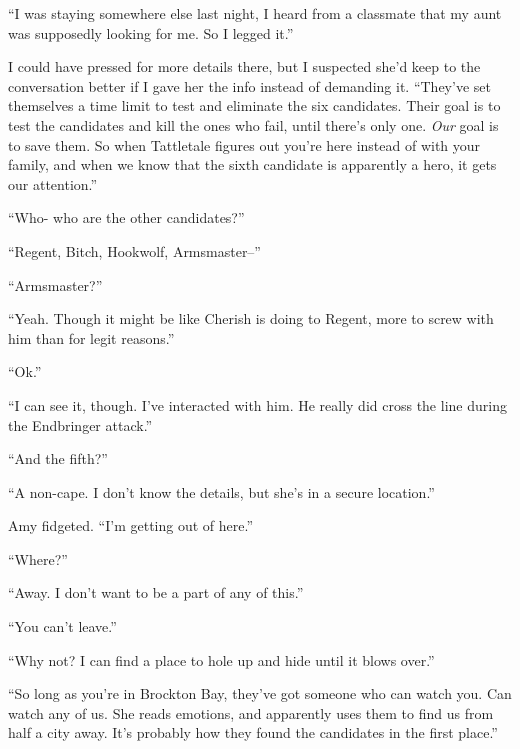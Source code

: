 ``I was staying somewhere else last night, I heard from a classmate that my aunt was supposedly looking for me.  So I legged it.''



I could have pressed for more details there, but I suspected she'd keep to the conversation better if I gave her the info instead of demanding it.  ``They've set themselves a time limit to test and eliminate the six candidates.  Their goal is to test the candidates and kill the ones who fail, until there's only one.  \emph{Our} goal is to save them.  So when Tattletale figures out you're here instead of with your family, and when we know that the sixth candidate is apparently a hero, it gets our attention.''



``Who- who are the other candidates?''



``Regent, Bitch, Hookwolf, Armsmaster--''



``Armsmaster?''



``Yeah.  Though it might be like Cherish is doing to Regent, more to screw with him than for legit reasons.''



``Ok.''



``I can see it, though.  I've interacted with him.  He really did cross the line during the Endbringer attack.''



``And the fifth?''



``A non-cape.  I don't know the details, but she's in a secure location.''



Amy fidgeted.  ``I'm getting out of here.''



``Where?''



``Away.  I don't want to be a part of any of this.''



``You can't leave.''



``Why not?  I can find a place to hole up and hide until it blows over.''



``So long as you're in Brockton Bay, they've got someone who can watch you.  Can watch any of us.  She reads emotions, and apparently uses them to find us from half a city away.  It's probably how they found the candidates in the first place.''



